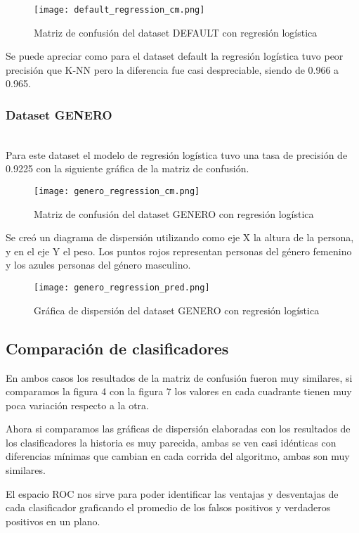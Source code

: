 \documentclass[sigconf,authorversion,nonacm]{acmart}
\begin{document}
\begin{figure}[H]
  \centering
  \texttt{[image: default\_regression\_cm.png]}
  \caption{Matriz de confusión del dataset DEFAULT con regresión logística}
\end{figure}

Se puede apreciar como para el dataset default la regresión logística tuvo peor precisión que K-NN pero la diferencia fue casi despreciable, siendo de 0.966 a 0.965.

\subsubsection{Dataset GENERO}\hfill\\
Para este dataset el modelo de regresión logística tuvo una tasa de precisión de 0.9225 con la siguiente  gráfica de la matriz de confusión.

\begin{figure}[H]
  \centering
  \texttt{[image: genero\_regression\_cm.png]}
  \caption{Matriz de confusión del dataset GENERO con regresión logística}
\end{figure}

Se creó un diagrama de dispersión utilizando como eje X la altura de la persona, y en el eje Y el peso. Los puntos rojos representan personas del género femenino y los azules personas del género masculino.

\begin{figure}[H]
  \centering
  \texttt{[image: genero\_regression\_pred.png]}
  \caption{Gráfica de dispersión del dataset GENERO con regresión logística}
\end{figure}

\subsection{Comparación de clasificadores}

En ambos casos los resultados de la matriz de confusión fueron muy similares, si comparamos la figura 4 con la figura 7 los valores en cada cuadrante tienen muy poca variación respecto a la otra.

Ahora si comparamos las gráficas de dispersión elaboradas con los resultados de los clasificadores la historia es muy parecida, ambas se ven casi idénticas con diferencias mínimas que cambian en cada corrida del algoritmo, ambas son muy similares. 

El espacio ROC nos sirve para poder identificar las ventajas y desventajas de cada clasificador graficando el promedio de los falsos positivos y verdaderos positivos en un plano.
\end{document}
